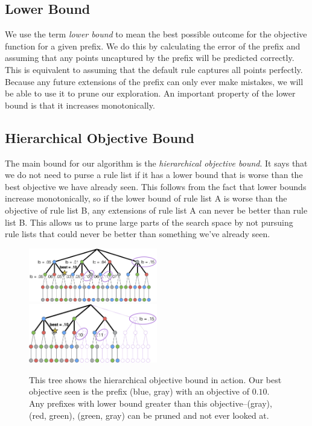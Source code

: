\documentclass[]{report}
\theoremstyle{definition}
\begin{document}
\subsection{Lower Bound}
We use the term \textit{lower bound} to mean the best possible outcome for the objective function for a given prefix.
We do this by calculating the error of the prefix and assuming that any points uncaptured by the prefix will be predicted correctly.
This is equivalent to assuming that the default rule captures all points perfectly.
Because any future extensions of the prefix can only ever make mistakes, we will be able to use it to prune our exploration.
An important property of the lower bound is that it increases monotonically.

\subsection{Hierarchical Objective Bound}
The main bound for our algorithm is the \textit{hierarchical objective bound}. 
It says that we do not need to purse a rule list if it has a lower bound that is worse than the best objective we have already seen.
This follows from the fact that lower bounds increase monotonically, so if the lower bound of rule list A is worse than the objective of rule list B, any extensions of rule list A can never be better than rule list B.
This allows us to prune large parts of the search space by not pursuing rule lists that could never be better than something we've already seen.

\begin{figure}
\includegraphics[width=0.5\textwidth]{figs/ela_branch-and-bound-tree.png}
\includegraphics[width=0.5\textwidth]{figs/ela_branch-and-bound-tree-pruned.png}
\caption[Objective bound]{This tree shows the hierarchical objective bound in action. Our best objective seen is the prefix (blue, gray) with an objective of $0.10$. Any prefixes with lower bound greater than this objective--(gray), (red, green), (green, gray) can be pruned and not ever looked at.
\label{fig:objective-bound}}
\end{figure}
\end{document}
